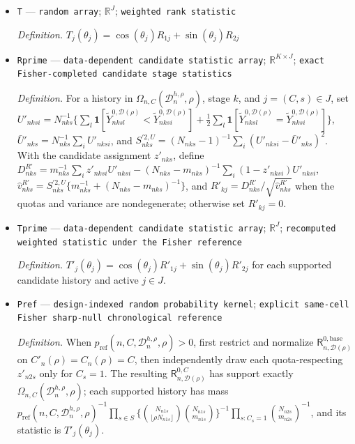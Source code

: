 \documentclass{article}
\begin{document}
\begin{itemize}
  \item \texttt{T} --- \texttt{random array}; \(\mathbb{R}^{J}\); \texttt{weighted rank statistic}
  \par\smallskip\noindent\emph{Definition.} \(T_j(\theta_j)=\cos(\theta_j)R_{1j}+\sin(\theta_j)R_{2j}\)
  \item \texttt{Rprime} --- \texttt{data-\allowbreak{}dependent candidate statistic array}; \(\mathbb R^{K\times J}\); \texttt{exact Fisher-\allowbreak{}completed candidate stage statistics}
  \par\smallskip\noindent\emph{Definition.} For a history in \(\Omega_{n,C}(\mathcal D_n^{h,\rho},\rho)\), stage \(k\), and \(j=(C,s)\in J\), set \(U'_{nksi}=N_{nks}^{-1}\{\sum_l\mathbf 1[\widetilde Y^{0,\mathcal D(\rho)}_{nksl}<\widetilde Y^{0,\mathcal D(\rho)}_{nksi}]+\tfrac12\sum_l\mathbf 1[\widetilde Y^{0,\mathcal D(\rho)}_{nksl}=\widetilde Y^{0,\mathcal D(\rho)}_{nksi}]\}\), \(\bar U'_{nks}=N_{nks}^{-1}\sum_iU'_{nksi}\), and \(S_{nks}^{\prime2,U}=(N_{nks}-1)^{-1}\sum_i(U'_{nksi}-\bar U'_{nks})^2\). With the candidate assignment \(z'_{nks}\), define \(D_{nks}^{R\prime}=m_{nks}^{-1}\sum_i z'_{nksi}U'_{nksi}-(N_{nks}-m_{nks})^{-1}\sum_i(1-z'_{nksi})U'_{nksi}\), \(\widehat v_{nks}^{R\prime}=S_{nks}^{\prime2,U}\{m_{nks}^{-1}+(N_{nks}-m_{nks})^{-1}\}\), and \(R'_{kj}=D_{nks}^{R\prime}/\sqrt{\widehat v_{nks}^{R\prime}}\) when the quotas and variance are nondegenerate; otherwise set \(R'_{kj}=0\).
  \item \texttt{Tprime} --- \texttt{data-\allowbreak{}dependent candidate statistic array}; \(\mathbb R^{J}\); \texttt{recomputed weighted statistic under the Fisher reference}
  \par\smallskip\noindent\emph{Definition.} \(T'_j(\theta_j)=\cos(\theta_j)R'_{1j}+\sin(\theta_j)R'_{2j}\) for each supported candidate history and active \(j\in J\).
  \item \texttt{Pref} --- \texttt{design-\allowbreak{}indexed random probability kernel}; \texttt{explicit same-\allowbreak{}cell Fisher sharp-\allowbreak{}null chronological reference}
  \par\smallskip\noindent\emph{Definition.} When \(p_{\mathrm{ref}}(n,C,\mathcal D_n^{h,\rho},\rho)>0\), first restrict and normalize \(\mathsf R_{n,\mathcal D(\rho)}^{0,\mathrm{base}}\) on \(C'_n(\rho)=C_n(\rho)=C\), then independently draw each quota-respecting \(z'_{n2s}\) only for \(C_s=1\). The resulting \(\mathsf R_{n,\mathcal D(\rho)}^{0,C}\) has support exactly \(\Omega_{n,C}(\mathcal D_n^{h,\rho},\rho)\); each supported history has mass \(p_{\mathrm{ref}}(n,C,\mathcal D_n^{h,\rho},\rho)^{-1}\prod_{s\in S}\{\binom{N_{n1s}}{\lfloor\rho N_{n1s}\rfloor}\binom{N_{n1s}}{m_{n1s}}\}^{-1}\prod_{s:C_s=1}\binom{N_{n2s}}{m_{n2s}}^{-1}\), and its statistic is \(T'_j(\theta_j)\).

\end{itemize}
\end{document}
